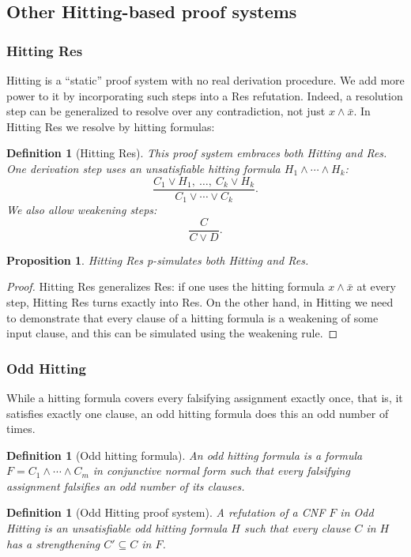 \documentclass[11pt]{article}
\newcommand{\scterm}[1]{{\textrm{\sc #1}}}
\newcommand{\hit}{\scterm{Hitting}}
\newcommand{\res}{\scterm{Res}}
\newcommand{\hitres}{{\hit} {\res}}
\newcommand{\hitodd}{\scterm{Odd} {\hit}}
\numberwithin{equation}{section}
\newtheorem{proposition}[theorem]{Proposition}
\newtheorem{definition}[theorem]{Definition}
\begin{document}
\subsection{Other {\hit}-based proof systems}
\subsubsection{{\hitres}}
{\hit} is a ``static'' proof system with no real derivation procedure.
We add more power to it by incorporating such steps into a {\res} refutation.
Indeed, a resolution step can be generalized to resolve over any contradiction, 
not just $x\land \bar{x}$.
In {\hitres} we resolve by hitting formulas:
\begin{definition}[{\hitres}]\label{def:hitres}
This proof system embraces both {\hit} and {\res}.
One derivation step uses an unsatisfiable hitting formula
$H_1\land\dotsb\land H_k$:
\[
\frac{C_1\lor H_1,\ \dotsc,\ C_k\lor H_k}{C_1\lor\dotsb\lor C_k}.
\]
We also allow weakening steps:
\[
\frac{C}{C\lor D}.
\]
\end{definition}
\begin{proposition}
{\hitres} p-simulates both {\hit} and {\res}.
\end{proposition}
\begin{proof}
{\hitres} generalizes {\res}: if one uses the hitting formula $x \land \bar{x}$
at every step, {\hitres} turns exactly into {\res}.
On the other hand, in {\hit} we need to demonstrate that every clause of a hitting formula
is a weakening of some input clause, and this can be simulated using the weakening rule.
\end{proof}
\subsubsection{{\hitodd}}
While a hitting formula covers every falsifying assignment exactly once,
that is, it satisfies exactly one clause, an odd hitting formula
does this an odd number of times.

\begin{definition}[Odd hitting formula]\label{def:hitoddformula}
An \emph{odd hitting formula} is a formula $F=C_1\land\dotsb\land C_m$ 
in conjunctive normal form such that every falsifying assignment
falsifies an odd number of its clauses.
\end{definition}
\begin{definition}[{\hitodd} proof system]\label{def:hitodd}
A refutation of a CNF $F$ in {\hitodd} is an unsatisfiable odd hitting formula $H$
such that every clause $C$ in $H$ has a strengthening $C'\subseteq C$ in $F$.
\end{definition}
\end{document}
